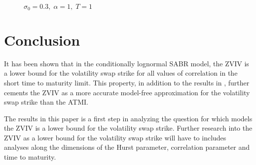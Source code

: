 \documentclass[11pt]{article}
\begin{document}
\begin{figure}
\centering
{}
\caption{$\sigma_0 = 0.3, \; \alpha = 1, \; T = 1$}
\end{figure}



\section{Conclusion}
It has been shown that in the conditionally lognormal SABR model, the ZVIV is a lower bound for the volatility swap strike for all values of correlation in the short time to maturity limit. This property, in addition to the results in \cite{ARS}, further cements the ZVIV as a more accurate model-free approximation for the volatility swap strike than the ATMI.

The results in this paper is a first step in analyzing the question for which models the ZVIV is a lower bound for the volatility swap strike. Further research into the ZVIV as a lower bound for the volatility swap strike will have to includes analyses along the dimensions of the Hurst parameter, correlation parameter and time to maturity.
\end{document}
